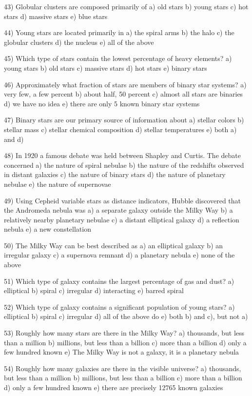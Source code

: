 43) Globular clusters are composed primarily of
a) old stars b) young stars c) hot stars d) massive stars e) blue stars

44) Young stars are located primarily in
a) the spiral arms b) the halo c) the globular clusters
d) the nucleus e) all of the above

45) Which type of stars contain the lowest percentage of heavy elements?
a) young stars b) old stars c) massive stars d) hot stars e) binary stars

46) Approximately what fraction of stars are members of binary star systems?
a) very few, a few percent b) about half, 50 percent
c) almost all stars are binaries d) we have no idea
e) there are only 5 known binary star systems

47) Binary stars are our primary source of information about
a) stellar colors b) stellar mass c) stellar chemical composition
d) stellar temperatures e) both a) and d)

48) In 1920 a famous debate was held between Shapley and Curtis.
The debate concerned
a) the nature of spiral nebulae
b) the nature of the redshifts observed in distant galaxies
c) the nature of binary stars
d) the nature of planetary nebulae
e) the nature of supernovae

49) Using Cepheid variable stars as distance indicators,
Hubble discovered that the Andromeda nebula was
a) a separate galaxy outside the Milky Way
b) a relatively nearby planetary nebulae
c) a distant elliptical galaxy
d) a reflection nebula
e) a new constellation

50) The Milky Way can be best described as
a) an elliptical galaxy b) an irregular galaxy c) a supernova remnant
d) a planetary nebula e) none of the above

51) Which type of galaxy contains the largest percentage of gas and dust?
a) elliptical b) spiral c) irregular d) interacting e) barred spiral

52) Which type of galaxy contains a significant population of young stars?
a) elliptical b) spiral c) irregular d) all of the above do
e) both b) and c), but not a)

53) Roughly how many stars are there in the Milky Way?
a) thousands, but less than a million
b) millions, but less than a billion
c) more than a billion
d) only a few hundred known
e) The Milky Way is not a galaxy, it is a planetary nebula

54) Roughly how many galaxies are there in the visible universe?
a) thousands, but less than a million
b) millions, but less than a billion
c) more than a billion
d) only a few hundred known
e) there are precisely 12765 known galaxies

